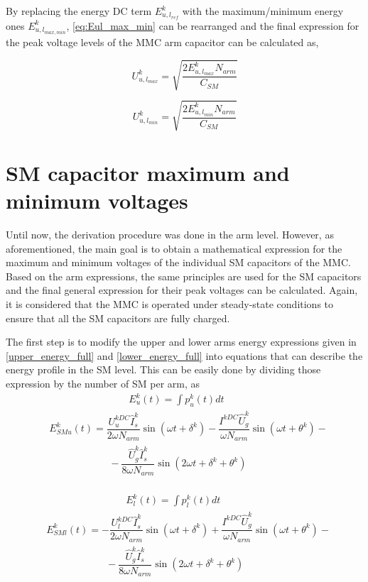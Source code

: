 \documentclass[journal]{IEEEtran}
\begin{document}
By replacing the energy DC term $E_{u,l_{ref}}^k$ with the maximum/minimum energy ones $E_{u,l_{max,min}}^k$, \eqref{eq:Eul_max_min} can be rearranged and the final expression for the peak voltage levels of the MMC arm capacitor can be calculated as,


\begin{equation}
U_{u,l_{max}}^k = \sqrt{\dfrac{2E_{u,l_{max}}^kN_{arm}}{C_{SM}}}
\label{eq:U_arm_max}
\end{equation}

\begin{equation}
U_{u,l_{min}}^k = \sqrt{\dfrac{2E_{u,l_{min}}^kN_{arm}}{C_{SM}}}
\label{eq:U_arm_min}
\end{equation}

\section{SM capacitor maximum and minimum voltages} \label{SM_voltage}

Until now, the derivation procedure was done in the arm level. However, as aforementioned, the main goal is to obtain a mathematical expression for the maximum and minimum voltages of the individual SM capacitors of the MMC. Based on the arm expressions, the same principles are used for the SM capacitors and the final general expression for their peak voltages can be calculated. Again, it is considered that the MMC is operated under steady-state conditions to ensure that all the SM capacitors are fully charged.

The first step is to modify the upper and lower arms energy expressions given in \eqref{upper_energy_full} and \eqref{lower_energy_full} into equations that can describe the energy profile in the SM level. This can be easily done by dividing those expression by the number of SM per arm, as 
~
\begin{align}
&\qquad\qquad\qquad\qquad  E_u^{k}(t) = \int p_u^{k}(t) dt \nonumber \\
&E_{SMu}^{k}(t) = \dfrac{U_u^{kDC}\hat{I}_s^k}{2\omega N_{arm}}\sin(\omega t + \delta^k ) - \dfrac{I^{kDC}\hat{U}_g^k}{\omega N_{arm}} \sin(\omega t + \theta^k) - \nonumber \\
&\qquad \qquad \qquad - \dfrac{\hat{U}_g^k \hat{I}_s^k}{8\omega N_{arm}}\sin(2\omega t + \delta^k + \theta^k) 
\label{eq:SM_upper_energy_full}
\end{align}
~
\begin{align}
&\qquad\qquad\qquad\qquad  E_l^{k}(t) = \int p_l^{k}(t) dt \nonumber \\
&E_{SMl}^{k}(t) = -\dfrac{U_l^{kDC}\hat{I}_s^k}{2\omega N_{arm}}\sin(\omega t + \delta^k ) + \dfrac{I^{kDC}\hat{U}_g^k}{\omega N_{arm}} \sin(\omega t + \theta^k) - \nonumber \\
&\qquad \qquad \qquad - \dfrac{\hat{U}_g^k \hat{I}_s^k}{8\omega N_{arm}}\sin(2\omega t + \delta^k + \theta^k)
\label{eq:SM_lower_energy_full}
\end{align}
\end{document}
